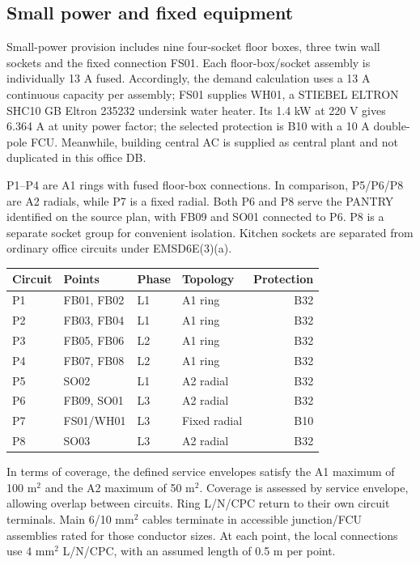 \subsection*{Small power and fixed equipment}
Small-power provision includes nine four-socket floor boxes, three twin wall sockets and the fixed connection FS01. Each floor-box/socket assembly is individually 13 A fused. Accordingly, the demand calculation uses a 13 A continuous capacity per assembly; FS01 supplies WH01, a STIEBEL ELTRON SHC10 GB Eltron 235232 undersink water heater. Its 1.4 kW at 220 V gives 6.364 A at unity power factor; the selected protection is B10 with a 10 A double-pole FCU. Meanwhile, building central AC is supplied as central plant and not duplicated in this office DB.

P1--P4 are A1 rings with fused floor-box connections. In comparison, P5/P6/P8 are A2 radials, while P7 is a fixed radial. Both P6 and P8 serve the PANTRY identified on the source plan, with FB09 and SO01 connected to P6. P8 is a separate socket group for convenient isolation. Kitchen sockets are separated from ordinary office circuits under EMSD6E(3)(a).
\begin{center}\begin{tabular}{llllr}\toprule
Circuit & Points & Phase & Topology & Protection\\\midrule

P1 & FB01, FB02 & L1 & A1 ring & B32 \\
P2 & FB03, FB04 & L1 & A1 ring & B32 \\
P3 & FB05, FB06 & L2 & A1 ring & B32 \\
P4 & FB07, FB08 & L2 & A1 ring & B32 \\
P5 & SO02 & L1 & A2 radial & B32 \\
P6 & FB09, SO01 & L3 & A2 radial & B32 \\
P7 & FS01/WH01 & L3 & Fixed radial & B10 \\
P8 & SO03 & L3 & A2 radial & B32 \\

\bottomrule\end{tabular}\end{center}
In terms of coverage, the defined service envelopes satisfy the A1 maximum of 100 m$^2$ and the A2 maximum of 50 m$^2$. Coverage is assessed by service envelope, allowing overlap between circuits. Ring L/N/CPC return to their own circuit terminals. Main 6/10 mm$^2$ cables terminate in accessible junction/FCU assemblies rated for those conductor sizes. At each point, the local connections use 4 mm$^2$ L/N/CPC, with an assumed length of 0.5 m per point.
\clearpage

